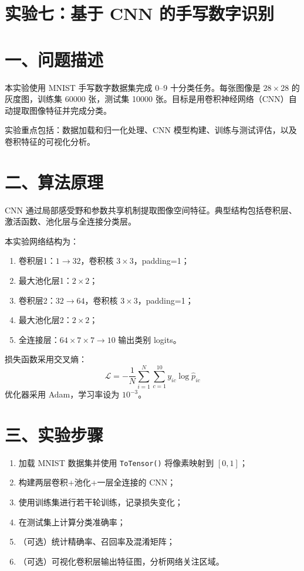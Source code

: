 \documentclass[12pt,a4paper]{ctexart}
\begin{document}
\section*{实验七：基于 CNN 的手写数字识别}

\section*{一、问题描述}
本实验使用 MNIST 手写数字数据集完成 0--9 十分类任务。每张图像是 $28\times28$ 的灰度图，训练集 60000 张，测试集 10000 张。目标是用卷积神经网络（CNN）自动提取图像特征并完成分类。

实验重点包括：数据加载和归一化处理、CNN 模型构建、训练与测试评估，以及卷积特征的可视化分析。

\section*{二、算法原理}
CNN 通过局部感受野和参数共享机制提取图像空间特征。典型结构包括卷积层、激活函数、池化层与全连接分类层。

本实验网络结构为：
\begin{enumerate}
	\item 卷积层1：$1\to32$，卷积核 $3\times3$，padding=1；
	\item 最大池化层1：$2\times2$；
	\item 卷积层2：$32\to64$，卷积核 $3\times3$，padding=1；
	\item 最大池化层2：$2\times2$；
	\item 全连接层：$64\times7\times7\to10$ 输出类别 logits。
\end{enumerate}

损失函数采用交叉熵：
\[
\mathcal{L} = -\frac{1}{N}\sum_{i=1}^{N}\sum_{c=1}^{10} y_{ic}\log\hat{p}_{ic}
\]
优化器采用 Adam，学习率设为 $10^{-3}$。

\section*{三、实验步骤}
\begin{enumerate}
	\item 加载 MNIST 数据集并使用 \texttt{ToTensor()} 将像素映射到 $[0,1]$；
	\item 构建两层卷积+池化+一层全连接的 CNN；
	\item 使用训练集进行若干轮训练，记录损失变化；
	\item 在测试集上计算分类准确率；
	\item （可选）统计精确率、召回率及混淆矩阵；
	\item （可选）可视化卷积层输出特征图，分析网络关注区域。
\end{enumerate}
\end{document}
